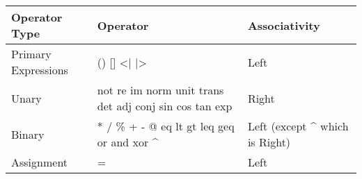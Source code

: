 \begin{flushleft}
\begin{tabular}{|l|l|l|}
	\hline    
	                   
	Operator Type & 
	Operator & 
	Associativity\\
	
	\hline
	Primary Expressions &
	\textsf{() [] <| |>} &
	Left\\
	Unary & 
	\textsf{not re im norm unit trans det adj conj sin cos tan exp} & 
	Right\\
	Binary & 
	\textsf{* / \% + - @ eq lt gt leq geq or and xor \string^} &
	Left (except \string^ which is Right)\\
	Assignment &
	\textsf{=} 
	& Left\\
	
	\hline  
\end{tabular}
\end{flushleft}
